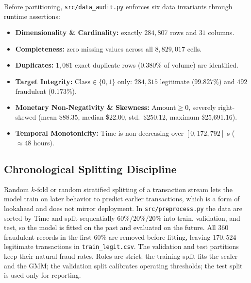 \documentclass[11pt, a4paper]{article}
\begin{document}
Before partitioning, \texttt{src/data\_audit.py} enforces six data invariants through runtime assertions:
\begin{itemize}
    \item \textbf{Dimensionality \& Cardinality:} exactly $284{,}807$ rows and $31$ columns.
    \item \textbf{Completeness:} zero missing values across all $8{,}829{,}017$ cells.
    \item \textbf{Duplicates:} $1{,}081$ exact duplicate rows ($0.380\%$ of volume) are identified.
    \item \textbf{Target Integrity:} $\text{Class} \in \{0,1\}$ only: $284{,}315$ legitimate ($99.827\%$) and $492$ fraudulent ($0.173\%$).
    \item \textbf{Monetary Non-Negativity \& Skewness:} $\text{Amount} \ge 0$, severely right-skewed (mean \$88.35, median \$22.00, std.\ \$250.12, maximum \$25,691.16).
    \item \textbf{Temporal Monotonicity:} $\text{Time}$ is non-decreasing over $[0, 172{,}792]$ s ($\approx 48$ hours).
\end{itemize}

\subsection{Chronological Splitting Discipline}
Random $k$-fold or random stratified splitting of a transaction stream lets the model train on later behavior to predict earlier transactions, which is a form of lookahead and does not mirror deployment. In \texttt{src/preprocess.py} the data are sorted by $\text{Time}$ and split sequentially $60\% / 20\% / 20\%$ into train, validation, and test, so the model is fitted on the past and evaluated on the future. All $360$ fraudulent records in the first $60\%$ are removed before fitting, leaving $170{,}524$ legitimate transactions in \texttt{train\_legit.csv}. The validation and test partitions keep their natural fraud rates. Roles are strict: the training split fits the scaler and the GMM; the validation split calibrates operating thresholds; the test split is used only for reporting.
\end{document}
